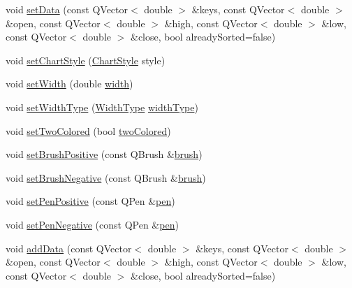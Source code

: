 \begin{DoxyCompactItemize}
\item 
void \mbox{\hyperlink{class_q_c_p_financial_a12992e669ed19d7bb48dbe601570cc05}{set\+Data}} (const Q\+Vector$<$ double $>$ \&keys, const Q\+Vector$<$ double $>$ \&open, const Q\+Vector$<$ double $>$ \&high, const Q\+Vector$<$ double $>$ \&low, const Q\+Vector$<$ double $>$ \&close, bool already\+Sorted=false)
\item 
void \mbox{\hyperlink{class_q_c_p_financial_a5a59175d36279d71596e64d7bb65596f}{set\+Chart\+Style}} (\mbox{\hyperlink{class_q_c_p_financial_a0f800e21ee98d646dfc6f8f89d10ebfb}{Chart\+Style}} style)
\item 
void \mbox{\hyperlink{class_q_c_p_financial_a99633f8bac86a61d534ae5eeb1a3068f}{set\+Width}} (double \mbox{\hyperlink{class_q_c_p_financial_a12548f13658eda5833204ef60f524870}{width}})
\item 
void \mbox{\hyperlink{class_q_c_p_financial_a204b7b710352796593a432b723e34089}{set\+Width\+Type}} (\mbox{\hyperlink{class_q_c_p_financial_aef1761dda71a53dc5269685e9e492626}{Width\+Type}} \mbox{\hyperlink{class_q_c_p_financial_a7afa595e63800c072701e6e57d4ca9e2}{width\+Type}})
\item 
void \mbox{\hyperlink{class_q_c_p_financial_a138e44aac160a17a9676652e240c5f08}{set\+Two\+Colored}} (bool \mbox{\hyperlink{class_q_c_p_financial_afd4b51de5be8e53776b649f9877a50e6}{two\+Colored}})
\item 
void \mbox{\hyperlink{class_q_c_p_financial_a5ebff2b1764efd07cc44942e67821829}{set\+Brush\+Positive}} (const Q\+Brush \&\mbox{\hyperlink{class_q_c_p_abstract_plottable_a893b4896dfd92b68b05b2600b80f5826}{brush}})
\item 
void \mbox{\hyperlink{class_q_c_p_financial_a8bbdd87629f9144b3ef51af660c0961a}{set\+Brush\+Negative}} (const Q\+Brush \&\mbox{\hyperlink{class_q_c_p_abstract_plottable_a893b4896dfd92b68b05b2600b80f5826}{brush}})
\item 
void \mbox{\hyperlink{class_q_c_p_financial_ac58aa3adc7a35aab0088764b840683e5}{set\+Pen\+Positive}} (const Q\+Pen \&\mbox{\hyperlink{class_q_c_p_abstract_plottable_ad5972efc31344e5a7a78ab4f8864b2d3}{pen}})
\item 
void \mbox{\hyperlink{class_q_c_p_financial_afe5c07e94ccea01a75b3a2476993c346}{set\+Pen\+Negative}} (const Q\+Pen \&\mbox{\hyperlink{class_q_c_p_abstract_plottable_ad5972efc31344e5a7a78ab4f8864b2d3}{pen}})
\item 
void \mbox{\hyperlink{class_q_c_p_financial_a372ac031e44a7a6c912d203556af96f7}{add\+Data}} (const Q\+Vector$<$ double $>$ \&keys, const Q\+Vector$<$ double $>$ \&open, const Q\+Vector$<$ double $>$ \&high, const Q\+Vector$<$ double $>$ \&low, const Q\+Vector$<$ double $>$ \&close, bool already\+Sorted=false)

\end{DoxyCompactItemize}
